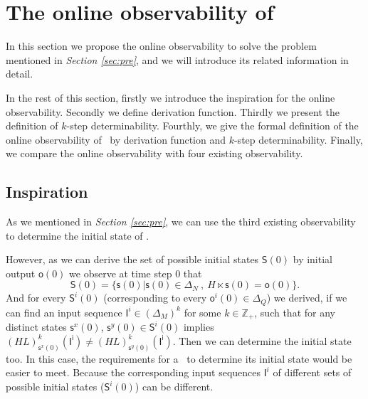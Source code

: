 \section{The online observability of \BCNs}
\label{sec:online}


In this section we propose the online observability to solve the problem mentioned in {\em Section \ref{sec:pre}}, and we will introduce its related information in detail. 

In the rest of this section, firstly we introduce the inspiration for the online observability. Secondly we define derivation function. Thirdly we present the definition of $k$-step determinability. Fourthly, we give the formal definition of the online observability of \BCNs\ by derivation function and $k$-step determinability. Finally, we compare the online observability with four existing observability.


\subsection{Inspiration}


As we mentioned in {\em Section \ref{sec:pre}}, we can use the third existing observability to determine the initial state of \BCN. 

However, as we can derive the set of possible initial states $\mathsf{S}(0)$ by initial output $\mathsf{o}(0)$ we observe at time step $0$ that
\[\mathsf{S}(0)=\{\mathsf{s}(0)|\mathsf{s}(0)\in \Delta_N\ ,\ H\ltimes \mathsf{s}(0)=\mathsf{o}(0)\}.\]
And for every $\mathsf{S}^{i}(0)$ (corresponding to every $\mathsf{o}^{i}(0)\in \Delta_Q$) we derived, if we can find an input sequence $\mathsf{I}^{i}\in(\Delta_M)^k$ for some $k\in \mathbb{Z}_+$, such that for any distinct states $\mathsf{s}^{x}(0)$, $\mathsf{s}^{y}(0) \in \mathsf{S}^{i}(0)$ implies $(HL)^k_{\mathsf{s}^{x}(0)}(\mathsf{I^i})\neq (HL)^k_{\mathsf{s}^{y}(0)}(\mathsf{I^i})$. 
Then we can determine the initial state too. 
In this case, the requirements for a \BCN\ to determine its initial state would be easier to meet. Because the corresponding input sequences $\mathsf{I}^{i}$ of different sets of possible initial states ($\mathsf{S}^{i}(0)$) can be different. 


